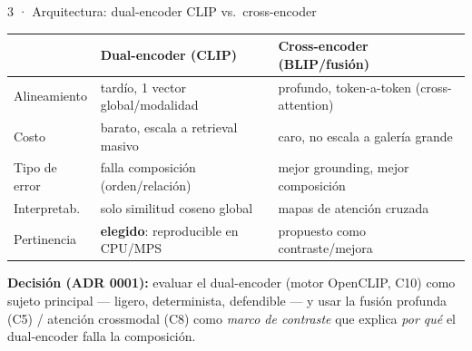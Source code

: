 \documentclass[aspectratio=169]{beamer}
\begin{document}
\begin{frame}{3 · Arquitectura: dual-encoder CLIP vs.\ cross-encoder}
  \small
  \begin{center}
  \begin{tabular}{lll}
    \toprule
     & \textbf{Dual-encoder (CLIP)} & \textbf{Cross-encoder (BLIP/fusión)} \\
    \midrule
    Alineamiento    & tardío, 1 vector global/modalidad & profundo, token-a-token (cross-attention) \\
    Costo           & barato, escala a retrieval masivo & caro, no escala a galería grande \\
    Tipo de error   & falla composición (orden/relación) & mejor grounding, mejor composición \\
    Interpretab.    & solo similitud coseno global & mapas de atención cruzada \\
    Pertinencia     & \textbf{elegido}: reproducible en CPU/MPS & propuesto como contraste/mejora \\
    \bottomrule
  \end{tabular}
  \end{center}
  \vfill
  \footnotesize\textbf{Decisión (ADR 0001):} evaluar el dual-encoder (motor OpenCLIP, C10) como sujeto principal
  --- ligero, determinista, defendible --- y usar la fusión profunda (C5) / atención crossmodal (C8) como
  \emph{marco de contraste} que explica \emph{por qué} el dual-encoder falla la composición.
\end{frame}
\end{document}
